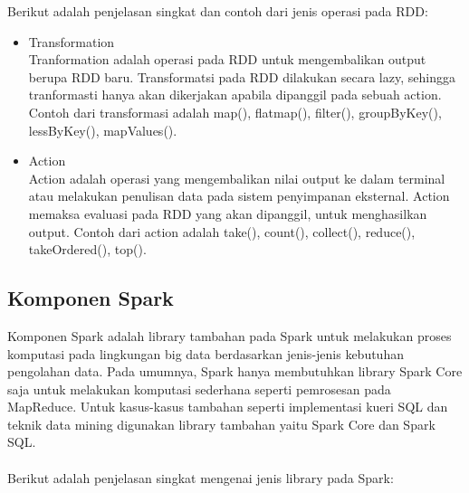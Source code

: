 \newpage
\noindent Berikut adalah penjelasan singkat dan contoh dari jenis operasi pada RDD:

\begin{itemize}
\item Transformation\\
Tranformation adalah operasi pada RDD untuk mengembalikan output berupa RDD baru. Transformatsi pada RDD dilakukan secara lazy, sehingga tranformasti hanya akan dikerjakan apabila dipanggil pada sebuah action. Contoh dari transformasi adalah map(), flatmap(), filter(), groupByKey(), lessByKey(), mapValues().

\item Action\\
Action adalah operasi yang mengembalikan nilai output ke dalam terminal atau melakukan penulisan data pada sistem penyimpanan eksternal. Action memaksa evaluasi pada RDD yang akan dipanggil, untuk menghasilkan output. Contoh dari action adalah take(), count(), collect(), reduce(), takeOrdered(), top().
\end{itemize}
 
 

\subsection{Komponen Spark}
Komponen Spark adalah library tambahan pada Spark untuk melakukan proses komputasi pada lingkungan big data berdasarkan jenis-jenis kebutuhan pengolahan data. Pada umumnya, Spark hanya membutuhkan library Spark Core saja untuk melakukan komputasi sederhana seperti pemrosesan pada MapReduce. Untuk kasus-kasus tambahan seperti implementasi kueri SQL dan teknik data mining digunakan library tambahan yaitu Spark Core dan Spark SQL. 
\\\\
Berikut adalah penjelasan singkat mengenai jenis library pada Spark:

